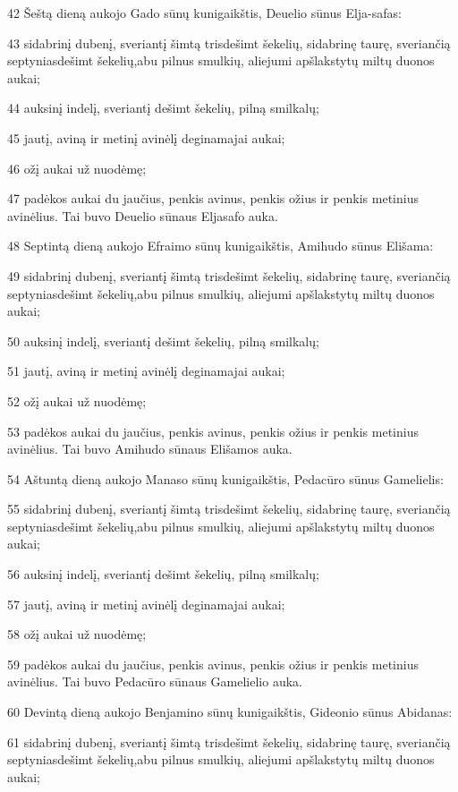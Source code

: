 \par 42 Šeštą dieną aukojo Gado sūnų kunigaikštis, Deuelio sūnus Elja-safas: 
\par 43 sidabrinį dubenį, sveriantį šimtą trisdešimt šekelių, sidabrinę taurę, sveriančią septyniasdešimt šekelių,­abu pilnus smulkių, aliejumi apšlakstytų miltų duonos aukai; 
\par 44 auksinį indelį, sveriantį dešimt šekelių, pilną smilkalų; 
\par 45 jautį, aviną ir metinį avinėlį deginamajai aukai; 
\par 46 ožį aukai už nuodėmę; 
\par 47 padėkos aukai du jaučius, penkis avinus, penkis ožius ir penkis metinius avinėlius. Tai buvo Deuelio sūnaus Eljasafo auka. 
\par 48 Septintą dieną aukojo Efraimo sūnų kunigaikštis, Amihudo sūnus Elišama: 
\par 49 sidabrinį dubenį, sveriantį šimtą trisdešimt šekelių, sidabrinę taurę, sveriančią septyniasdešimt šekelių,­abu pilnus smulkių, aliejumi apšlakstytų miltų duonos aukai; 
\par 50 auksinį indelį, sveriantį dešimt šekelių, pilną smilkalų; 
\par 51 jautį, aviną ir metinį avinėlį deginamajai aukai; 
\par 52 ožį aukai už nuodėmę; 
\par 53 padėkos aukai du jaučius, penkis avinus, penkis ožius ir penkis metinius avinėlius. Tai buvo Amihudo sūnaus Elišamos auka. 
\par 54 Aštuntą dieną aukojo Manaso sūnų kunigaikštis, Pedacūro sūnus Gamelielis: 
\par 55 sidabrinį dubenį, sveriantį šimtą trisdešimt šekelių, sidabrinę taurę, sveriančią septyniasdešimt šekelių,­abu pilnus smulkių, aliejumi apšlakstytų miltų duonos aukai; 
\par 56 auksinį indelį, sveriantį dešimt šekelių, pilną smilkalų; 
\par 57 jautį, aviną ir metinį avinėlį deginamajai aukai; 
\par 58 ožį aukai už nuodėmę; 
\par 59 padėkos aukai du jaučius, penkis avinus, penkis ožius ir penkis metinius avinėlius. Tai buvo Pedacūro sūnaus Gamelielio auka. 
\par 60 Devintą dieną aukojo Benjamino sūnų kunigaikštis, Gideonio sūnus Abidanas: 
\par 61 sidabrinį dubenį, sveriantį šimtą trisdešimt šekelių, sidabrinę taurę, sveriančią septyniasdešimt šekelių,­abu pilnus smulkių, aliejumi apšlakstytų miltų duonos aukai; 
